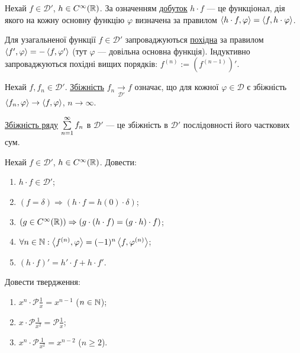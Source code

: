 \begin{theory}
    Нехай $f \in \mathcal{D}'$, $h \in C^{\infty}(\mathbb{R})$. За означенням \ul{добуток} $h\cdot f$ --- це 
    функціонал, дія якого на кожну основну функцію $\varphi$ визначена за правилом $\left\langle h\cdot f, \varphi\right\rangle = \left\langle f, h\cdot \varphi\right\rangle$.

    \noindent Для узагальненої функції $f \in\mathcal{D}'$ запроваджуються \ul{похідна} за правилом
    $\left\langle f', \varphi\right\rangle = -\left\langle f, \varphi'\right\rangle$ (тут $\varphi$ --- довільна основна функція).
    Індуктивно запроваджуються похідні вищих порядків: $f^{(n)} := \left( f^{(n-1)}\right)'$.

    \noindent Нехай $f, f_n \in \mathcal{D}'$. \ul{Збіжність} $f_n \underset{\mathcal{D}'}{\to} f$ означає,
    що для кожної $\varphi \in \mathcal{D}$ є збіжність $\left\langle f_n, \varphi\right\rangle \to \left\langle f, \varphi\right\rangle$, $n \to \infty$.
    
    \noindent \ul{Збіжність ряду} $\sum\limits_{n=1}^{\infty} f_n$ в $\mathcal{D}'$ --- це
    збіжність в $\mathcal{D}'$ послідовності його часткових сум.
\end{theory}
\begin{exercise}
    Нехай $f \in \mathcal{D}'$, $h \in  C^{\infty}(\mathbb{R})$. Довести:
    \begin{enumerate}
        \item $h \cdot f \in \mathcal{D}'$;
        \item $(f = \delta) \Rightarrow (h\cdot f = h(0) \cdot \delta)$;
        \item $(g \in C^{\infty}(\mathbb{R})) \Rightarrow (g\cdot(h\cdot f) = (g \cdot h) \cdot f)$;
        \item $\forall n \in \mathbb{N}: \left\langle f^{(n)}, \varphi\right\rangle = (-1)^n \left\langle f, \varphi^{(n)}\right\rangle$;
        \item $(h \cdot f)' = h'\cdot f + h\cdot f'$.
    \end{enumerate}
\end{exercise}
\begin{exercise}
    Довести твердження:
    \begin{enumerate}
        \item $x^n \cdot \mathcal{P}\frac{1}{x} = x^{n-1}$ ($n \in \mathbb{N}$);
        \item $x \cdot \mathcal{P}\frac{1}{x^2} = \mathcal{P}\frac{1}{x}$;
        \item $x^n \cdot \mathcal{P}\frac{1}{x^2} = x^{n-2}$ ($n \geq 2$).
    \end{enumerate}
\end{exercise}
